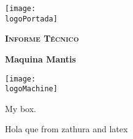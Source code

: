 \documentclass[a4paper]{article}
\newcommand{\logoPortada}{images/logo.png}
\newcommand{\logoMachine}{images/mantis3.png}
\newcommand{\machineName}{Maquina Mantis}
\begin{document}
\begin{titlepage}
  \centering
  \texttt{[image: \\logoPortada]}\par{}\vspace{1cm}
  {\scshape\LARGE \textbf{Informe Técnico}\par{}}
  \vspace{0.2cm}
  {\Huge\bfseries\textcolor{greenPortada}{\machineName}\par{}}
  \texttt{[image: \\logoMachine]}\par{}\vspace{1cm}
  \begin{tcolorbox}[colback=red!5!white,colframe=red!75!black]
    My box.
  \end{tcolorbox}
\end{titlepage}
  Hola que from zathura and latex 
\end{document}
